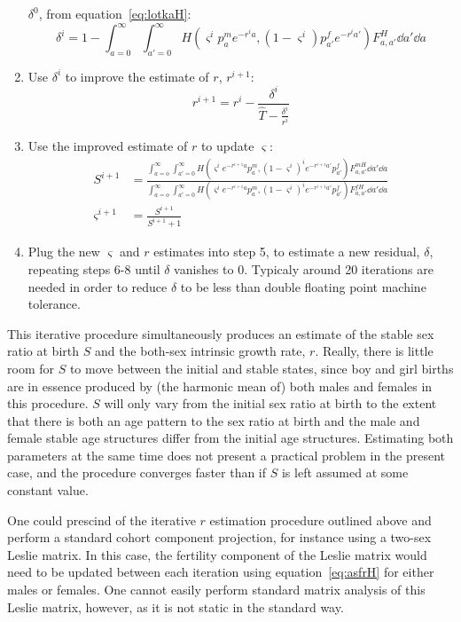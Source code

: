 \begin{enumerate}
  $\delta^0$, from equation~\eqref{eq:lotkaH}:
  \begin{equation}
  \delta^i = 1 - \int _{a=0}^\infty \int _{a'=0}^\infty H(\varsigma^i p_a^m
  e^{-r^ia}, (1-\varsigma^i)p_{a'}^fe^{-r^ia'}) F_{a,a'}^H \dd a' \dd a
  \end{equation}
  \item Use $\delta^i$ to improve the estimate of $r$, $r^{i+1}$:
  \begin{equation}
  r^{i+1} = r^i - \frac{\delta^i}{\widehat{T} - \frac{\delta^i}{r^i}}
  \end{equation}
  \item Use the improved estimate of $r$ to update $\varsigma$:
  \begin{align}
  S^{i+1} &= \frac{\int_{a=o}^\infty \int_{a'=0}^\infty H(\varsigma^i
  e^{-r^{i+1}a} p_a^m, (1-\varsigma^i)^i e^{-r^{i+1}a'}p_{a'}^f) F_{a,a'}^{mH} \dd a' \dd a
  }{\int_{a=o}^\infty \int_{a'=0}^\infty H(\varsigma^i e^{-r^{i+1}a}
  p_a^m, (1-\varsigma^i)^i e^{-r^{i+1}a'}p_{a'}^f) F_{a,a'}^{fH} \dd a' \dd a }
  \\
  \varsigma^{i+1} &= \frac{S^{i+1}}{S^{i+1}+1}
  \end{align}
  \item Plug the new $\varsigma$ and $r$ estimates into step 5, to estimate a
  new residual, $\delta$, repeating steps 6-8 until $\delta$ vanishes to 0.
  Typicaly around 20 iterations are needed in order to reduce $\delta$ to
  be less than double floating point machine tolerance.
\end{enumerate}

This iterative procedure simultaneously produces an estimate of the stable
sex ratio at birth $S$ and the both-sex intrinsic growth rate, $r$. Really,
there is little room for $S$ to move between the initial and stable states,
since boy and girl births are in essence produced by (the harmonic mean of) both
males and females in this procedure. $S$
will only vary from the initial sex ratio at birth to the extent that there is
both an age pattern to the sex ratio at birth and the male and female stable age
structures differ from the initial age structures. Estimating both parameters at
the same time does not present a practical problem in the present case, and the
procedure converges faster than if $S$ is left assumed at some constant value.

One could prescind of the iterative $r$ estimation procedure outlined above and
perform a standard cohort component projection, for instance using a
two-sex Leslie matrix. In this case, the fertility component of the Leslie
matrix would need to be updated between each iteration using equation~\ref{eq:asfrH} for either
males or females. One cannot easily perform standard matrix analysis of this
Leslie matrix, however, as it is not static in the standard way.

